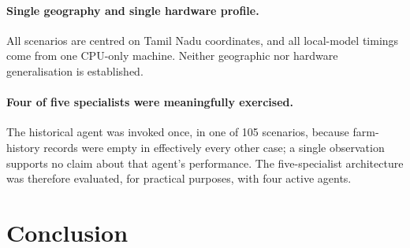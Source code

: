\documentclass[preprint,12pt]{elsarticle}
\begin{document}
\paragraph{Single geography and single hardware profile.} All scenarios are
centred on Tamil Nadu coordinates, and all local-model timings come from
one CPU-only machine. Neither geographic nor hardware generalisation is
established.

\paragraph{Four of five specialists were meaningfully exercised.} The
historical agent was invoked once, in one of 105 scenarios, because
farm-history records were empty in effectively every other case; a
single observation supports no claim about that agent's performance. The
five-specialist architecture was therefore evaluated, for practical
purposes, with four active agents.

\section{Conclusion}
\label{sec:conclusion}
\end{document}
